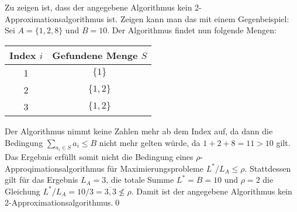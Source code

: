\documentclass[a4paper]{article}
\begin{document}
	\maketitle
	\section{}
		\subsubsection{}
		Zu zeigen ist, dass der angegebene Algorithmus kein 2-Approximationsalgorithmus ist. Zeigen kann man das mit einem Gegenbeispiel:\n
		Sei $A=\{1, 2, 8\}$ und $B=10$. Der Algorithmus findet nun folgende Mengen:
		\begin{center}
			\begin{tabular}{c|c}
				Index $i$ & Gefundene Menge $S$\\\hline
				1 & $\{1\}$\\
				2 & $\{1, 2\}$\\
				3 & $\{1, 2\}$\\
			\end{tabular}
		\end{center}
		Der Algorithmus nimmt keine Zahlen mehr ab dem Index auf, da dann die Bedingung $\sum\limits_{a_i\in S} a_i\leq B$ nicht mehr gelten würde, da $1+2+8=11>10$ gilt.\n
		Das Ergebnis erfüllt somit nicht die Bedingung eines $\rho$-Approqimationsalgorithmus für Maximierungsprobleme $L^*/L_A\leq \rho$. Stattdessen gilt für das Ergebnis $L_A=3$, die totale Summe $L^*=B=10$ und $\rho=2$ die Gleichung $L^*/L_A=10/3=\overline{3,3}\not\leq\rho$.\n
		Damit ist der angegebene Algorithmus kein 2-Approximationsalgorithmus.\qed
		\subsubsection{}
	\section{}
\end{document}
